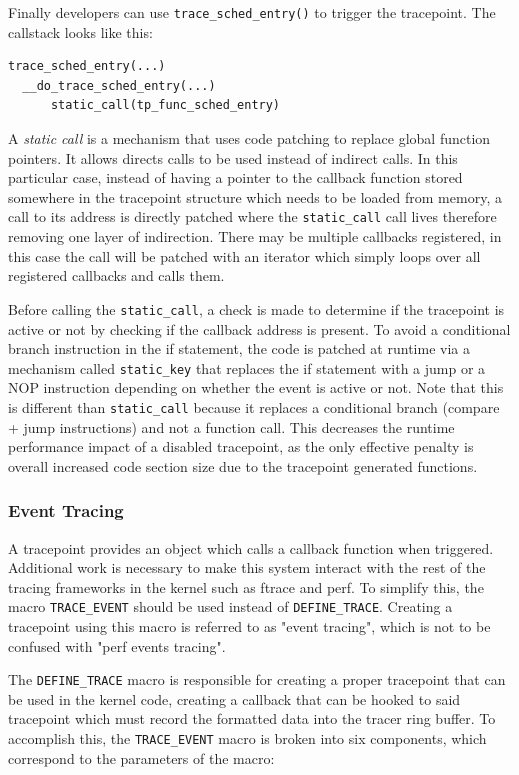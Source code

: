 Finally developers can use \verb|trace_sched_entry()| to trigger the tracepoint.
The callstack looks like this:

\begin{verbatim}
trace_sched_entry(...)
  __do_trace_sched_entry(...)
      static_call(tp_func_sched_entry)
\end{verbatim}

A \textit{static call} is a mechanism that uses code patching to replace global
function pointers. It allows directs calls to be used instead of indirect calls.
In this particular case, instead of having a pointer to the callback function
stored somewhere in the tracepoint structure which needs to be loaded from
memory, a call to its address is directly patched where the \verb|static_call|
call lives therefore removing one layer of indirection. There may be multiple
callbacks registered, in this case the call will be patched with an iterator
which simply loops over all registered callbacks and calls them.

Before calling the \verb|static_call|, a check is made to determine if the
tracepoint is active or not by checking if the callback address is present. To
avoid a conditional branch instruction in the if statement, the code is patched
at runtime via a mechanism called \verb|static_key| that replaces the if
statement with a jump or a NOP instruction depending on whether the event is
active or not. Note that this is different than \verb|static_call| because it
replaces a conditional branch (compare + jump instructions) and not a function
call. This decreases the runtime performance impact of a disabled tracepoint, as
the only effective penalty is overall increased code section size due to the
tracepoint generated functions.

\subsubsection*{Event Tracing}

A tracepoint provides an object which calls a callback function when triggered.
Additional work is necessary to make this system interact with the rest of the
tracing frameworks in the kernel such as ftrace and perf. To simplify this, the
macro \verb|TRACE_EVENT| should be used instead of \verb|DEFINE_TRACE|. Creating
a tracepoint using this macro is referred to as "event tracing", which is not to
be confused with "perf events tracing".

The \verb|DEFINE_TRACE| macro is responsible for creating a proper tracepoint
that can be used in the kernel code, creating a callback that can be hooked to
said tracepoint which must record the formatted data into the tracer ring
buffer. To accomplish this, the \verb|TRACE_EVENT| macro is broken into six
components, which correspond to the parameters of the macro:

